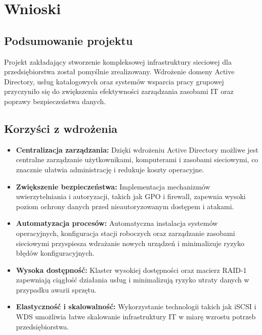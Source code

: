 \newpage
\section{Wnioski}	%

\subsection{Podsumowanie projektu}
Projekt zakładający stworzenie kompleksowej infrastruktury sieciowej dla przedsiębiorstwa został pomyślnie zrealizowany. Wdrożenie domeny Active Directory, usług katalogowych oraz systemów wsparcia pracy grupowej przyczyniło się do zwiększenia efektywności zarządzania zasobami IT oraz poprawy bezpieczeństwa danych.

\subsection{Korzyści z wdrożenia}
\begin{itemize}
    \item \textbf{Centralizacja zarządzania:} Dzięki wdrożeniu Active Directory możliwe jest centralne zarządzanie użytkownikami, komputerami i zasobami sieciowymi, co znacznie ułatwia administrację i redukuje koszty operacyjne.
    \item \textbf{Zwiększenie bezpieczeństwa:} Implementacja mechanizmów uwierzytelniania i autoryzacji, takich jak GPO i firewall, zapewnia wysoki poziom ochrony danych przed nieautoryzowanym dostępem i atakami.
    \item \textbf{Automatyzacja procesów:} Automatyczna instalacja systemów operacyjnych, konfiguracja stacji roboczych oraz zarządzanie zasobami sieciowymi przyspiesza wdrażanie nowych urządzeń i minimalizuje ryzyko błędów konfiguracyjnych.
    \item \textbf{Wysoka dostępność:} Klaster wysokiej dostępności oraz macierz RAID-1 zapewniają ciągłość działania usług i minimalizują ryzyko utraty danych w przypadku awarii sprzętu.
    \item \textbf{Elastyczność i skalowalność:} Wykorzystanie technologii takich jak iSCSI i WDS umożliwia łatwe skalowanie infrastruktury IT w miarę wzrostu potrzeb przedsiębiorstwa.
\end{itemize}

